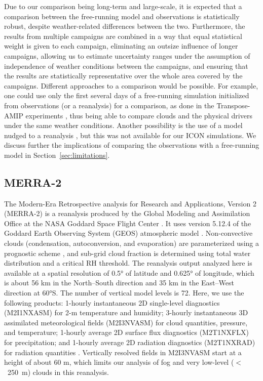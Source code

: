 \documentclass[draft]{agujournal2019}
\begin{document}
Due to our comparison being long-term and large-scale, it is expected that a comparison between the free-running model and observations is statistically robust, despite weather-related differences between the two. Furthermore, the results from multiple campaigns are combined in a way that equal statistical weight is given to each campaign, eliminating an outsize influence of longer campaigns, allowing us to estimate uncertainty ranges under the assumption of independence of weather conditions between the campaigns, and ensuring that the results are statistically representative over the whole area covered by the campaigns. Different approaches to a comparison would be possible. For example, one could use only the first several days of a free-running simulation initialized from observations (or a reanalysis) for a comparison, as done in the Transpose-AMIP experiments \cite{williams2013}, thus being able to compare clouds and the physical drivers under the same weather conditions. Another possibility is the use of a model nudged to a reanalysis \cite{kuma2020}, but this was not available for our ICON simulations. We discuss further the implications of comparing the observations with a free-running model in Section~\ref{sec:limitations}.

\subsection{MERRA-2}

The Modern-Era Retrospective analysis for Research and Applications, Version 2 (MERRA-2) is a reanalysis produced by the Global Modeling and Assimilation Office at the NASA Goddard Space Flight Center \cite{gelaro2017}. It uses version 5.12.4 of the Goddard Earth Observing System (GEOS) atmospheric model \cite{rienecker2008,molod2015}. Non-convective clouds (condensation, autoconversion, and evaporation) are parameterized using a prognostic scheme \cite{bacmeister2006}, and sub-grid cloud fraction is determined using total water distribution and a critical RH threshold. The reanalysis output analyzed here is available at a spatial resolution of 0.5° of latitude and 0.625° of longitude, which is about 56 km in the North--South direction and 35 km in the East--West direction at 60°S. The number of vertical model levels is 72. Here, we use the following products: 1-hourly instantaneous 2D single-level diagnostics (M2I1NXASM) for 2-m temperature and humidity; 3-hourly instantaneous 3D assimilated meteorological fields (M2I3NVASM) for cloud quantities, pressure, and temperature; 1-hourly average 2D surface flux diagnostics (M2T1NXFLX) for precipitation; and 1-hourly average 2D radiation diagnostics (M2T1NXRAD) for radiation quantities \cite{merra2}. Vertically resolved fields in M2I3NVASM start at a height of about 60 m, which limits our analysis of fog and very low-level ($<$~250~m) clouds in this reanalysis.
\end{document}
